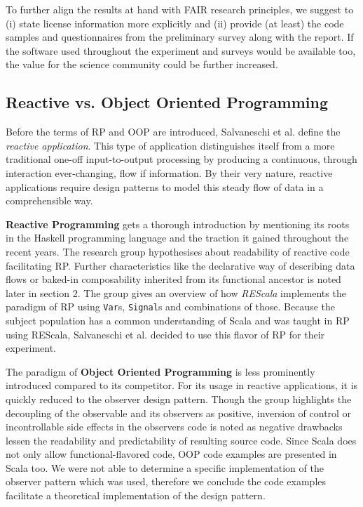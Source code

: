 \documentclass[12pt,a4paper]{article}
\begin{document}
To further align the results at hand with FAIR research principles, we suggest to (i) state license information more explicitly and (ii) provide (at least) the code samples and questionnaires from the preliminary survey along with the report. If the software used throughout the experiment and surveys would be available too, the value for the science community could be further increased.

\subsection{Reactive vs. Object Oriented Programming}

Before the terms of RP and OOP are introduced, Salvaneschi et al. define the \emph{reactive application}. This type of application distinguishes itself from a more traditional one-off input-to-output processing by producing a continuous, through interaction ever-changing, flow if information. By their very nature, reactive applications require design patterns to model this steady flow of data in a comprehensible way.

\textbf{Reactive Programming} gets a thorough introduction by mentioning its roots in the Haskell programming language and the traction it gained throughout the recent years. The research group hypothesises about readability of reactive code facilitating RP. Further characteristics like the declarative way of describing data flows or baked-in composability inherited from its functional ancestor is noted later in section 2. The group gives an overview of how \emph{REScala} implements the paradigm of RP using \texttt{Var}s, \texttt{Signal}s and combinations of those. Because the subject population has a common understanding of Scala and was taught in RP using REScala, Salvaneschi et al. decided to use this flavor of RP for their experiment.

The paradigm of \textbf{Object Oriented Programming} is less prominently introduced compared to its competitor. For its usage in reactive applications, it is quickly reduced to the observer design pattern. Though the group highlights the decoupling of the observable and its observers as positive, inversion of control or incontrollable side effects in the observers code is noted as negative drawbacks lessen the readability and predictability of resulting source code. Since Scala does not only allow functional-flavored code, OOP code examples are presented in Scala too. We were not able to determine a specific implementation of the observer pattern which was used, therefore we conclude the code examples facilitate a theoretical implementation of the design pattern.
\end{document}
